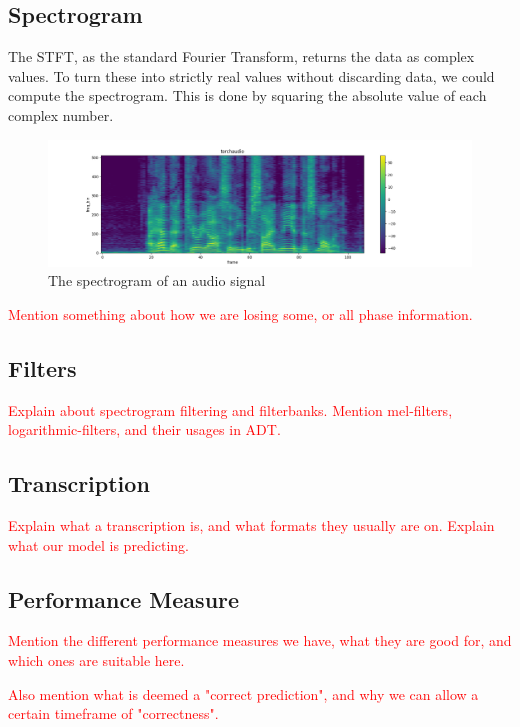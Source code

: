 \subsection{Spectrogram}

The \gls{STFT}, as the standard Fourier Transform, returns the data as complex values. To turn these into strictly real values without discarding data, we could compute the spectrogram. This is done by squaring the absolute value of each complex number. 

\begin{figure}[H]
    \centering
    \includegraphics[scale=0.35]{figures/spectrogram}
    \caption{The spectrogram of an audio signal}
    \label{SpectrogramFigure}
\end{figure}

\textcolor{red}{Mention something about how we are losing some, or all phase information.}

\subsection{Filters}

\textcolor{red}{Explain about spectrogram filtering and filterbanks. Mention mel-filters, logarithmic-filters, and their usages in ADT.}

\subsection{Transcription}

\textcolor{red}{Explain what a transcription is, and what formats they usually are on. Explain what our model is predicting.}

\subsection{Performance Measure}

\textcolor{red}{Mention the different performance measures we have, what they are good for, and which ones are suitable here.}

\textcolor{red}{Also mention what is deemed a "correct prediction", and why we can allow a certain timeframe of "correctness".}